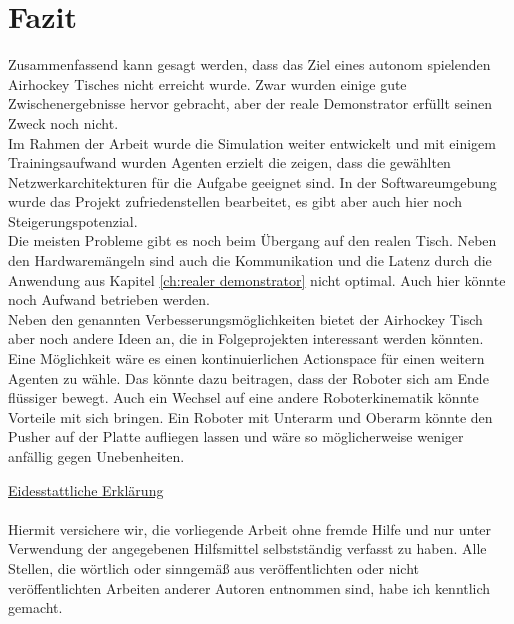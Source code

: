 \chapter{Fazit}  
\label{ch:Fazit}

Zusammenfassend kann gesagt werden, dass das Ziel eines autonom spielenden Airhockey Tisches nicht erreicht wurde. Zwar wurden einige gute Zwischenergebnisse hervor gebracht, aber der reale Demonstrator erfüllt seinen Zweck noch nicht.\\
Im Rahmen der Arbeit wurde die Simulation weiter entwickelt und mit einigem Trainingsaufwand wurden Agenten erzielt die zeigen, dass die gewählten Netzwerkarchitekturen für die Aufgabe geeignet sind. In der Softwareumgebung wurde das Projekt zufriedenstellen bearbeitet, es gibt aber auch hier noch Steigerungspotenzial.\\
Die meisten Probleme gibt es noch beim Übergang auf den realen Tisch. Neben den Hardwaremängeln sind auch die Kommunikation und die Latenz durch die Anwendung aus Kapitel \ref{ch:realer demonstrator} nicht optimal. Auch hier könnte noch Aufwand betrieben werden.\\
Neben den genannten Verbesserungsmöglichkeiten bietet der Airhockey Tisch aber noch andere Ideen an, die in Folgeprojekten interessant werden könnten. Eine Möglichkeit wäre es einen kontinuierlichen Actionspace für einen weitern Agenten zu wähle. Das könnte dazu beitragen, dass der Roboter sich am Ende flüssiger bewegt. Auch ein Wechsel auf eine andere Roboterkinematik könnte Vorteile mit sich bringen. Ein Roboter mit Unterarm und Oberarm könnte den Pusher auf der Platte aufliegen lassen und wäre so möglicherweise weniger anfällig gegen Unebenheiten.


\newpage
\underline{Eidesstattliche Erklärung}\\\\
Hiermit versichere wir, die vorliegende Arbeit ohne fremde Hilfe und nur unter Verwendung
der angegebenen Hilfsmittel selbstständig verfasst zu haben. Alle Stellen, die wörtlich oder
sinngemäß aus veröffentlichten oder nicht veröffentlichten Arbeiten anderer Autoren entnommen sind, habe ich kenntlich gemacht.

